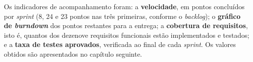 Os indicadores de acompanhamento foram: a \textbf{velocidade}, em pontos concluídos por \textit{sprint} (8, 24 e 23 pontos nas três primeiras, conforme o \textit{backlog}); o \textbf{gráfico de \textit{burndown}} dos pontos restantes para a entrega; a \textbf{cobertura de requisitos}, isto é, quantos dos dezenove requisitos funcionais estão implementados e testados; e a \textbf{taxa de testes aprovados}, verificada ao final de cada \textit{sprint}. Os valores obtidos são apresentados no capítulo seguinte.
